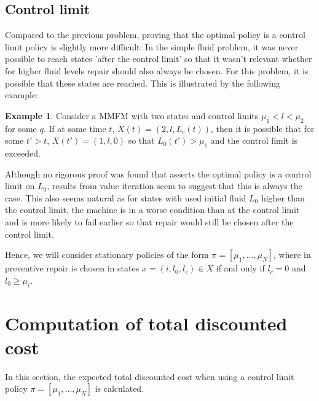 \documentclass[a4paper]{thesis}
\theoremstyle{definition}
\newtheorem{example}{Example}[chapter]
\begin{document}
\subsection{Control limit}
Compared to the previous problem, proving that the optimal policy is a control limit policy is slightly more difficult:
In the simple fluid problem, it was never possible to reach states 'after the control limit' so that it wasn't relevant whether for higher fluid levels repair should also always be chosen.
For this problem, it is possible that these states are reached.
This is illustrated by the following example:
\begin{example}
	Consider a MMFM with two states and control limits $\mu_1<l<\mu_2$ for some $q$.
	If at some time $t$, $X(t)=(2,l,L_c(t))$, then it is possible that for some $t'>t$, $X(t')=(1,l,0)$ so that $L_0(t')>\mu_1$ and the control limit is exceeded.
\end{example}
Although no rigorous proof was found that asserts the optimal policy is a control limit on $L_0$, results from value iteration seem to suggest that this is always the case.
This also seems natural as for states with used initial fluid $L_0$ higher than the control limit, the machine is in a worse condition than at the control limit and is more likely to fail earlier so that repair would still be chosen after the control limit.

Hence, we will consider stationary policies of the form $\pi=[\mu_1,...,\mu_N]$, where in preventive repair is chosen in states $x=(i,l_0,l_c)\in X$ if and only if $l_c=0$ and $l_0\geq \mu_i$. \section{Computation of total discounted cost}
In this section, the expected total discounted cost when using a control limit policy $\pi=[\mu_1,...,\mu_N]$ is calculated.
\end{document}
